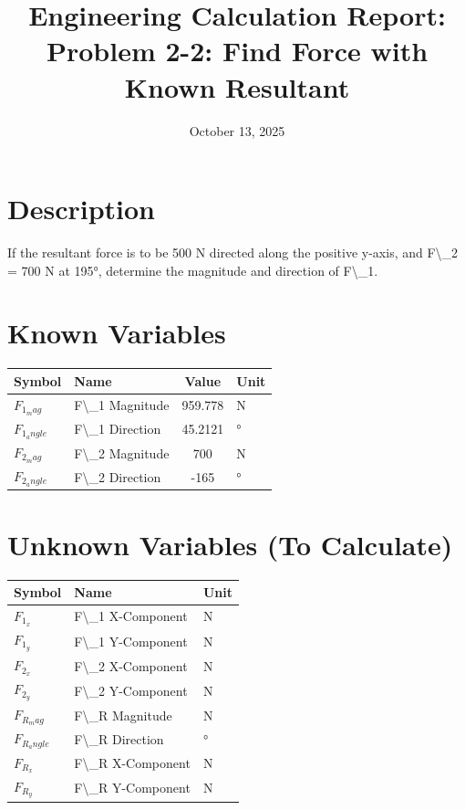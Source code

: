 \documentclass[11pt,a4paper]{article}
\title{Engineering Calculation Report: Problem 2-2: Find Force with Known Resultant}
\date{October 13, 2025}
\begin{document}
\maketitle

\section*{Description}

    If the resultant force is to be 500 N directed along the positive y-axis,
    and F\textbackslash{}_2 = 700 N at 195°, determine the magnitude and direction of F\textbackslash{}_1.
    

\section{Known Variables}

\begin{longtable}{llSl}
\toprule
Symbol & Name & {Value} & Unit \\
\midrule
\endhead
$F_{1_mag}$ & F\textbackslash{}_1 Magnitude & 959.778 & N \\
$F_{1_angle}$ & F\textbackslash{}_1 Direction & 45.2121 & ° \\
$F_{2_mag}$ & F\textbackslash{}_2 Magnitude & 700 & N \\
$F_{2_angle}$ & F\textbackslash{}_2 Direction & -165 & ° \\
\bottomrule
\end{longtable}

\section{Unknown Variables (To Calculate)}

\begin{longtable}{lll}
\toprule
Symbol & Name & Unit \\
\midrule
\endhead
$F_{1_x}$ & F\textbackslash{}_1 X-Component & N \\
$F_{1_y}$ & F\textbackslash{}_1 Y-Component & N \\
$F_{2_x}$ & F\textbackslash{}_2 X-Component & N \\
$F_{2_y}$ & F\textbackslash{}_2 Y-Component & N \\
$F_{R_mag}$ & F\textbackslash{}_R Magnitude & N \\
$F_{R_angle}$ & F\textbackslash{}_R Direction & ° \\
$F_{R_x}$ & F\textbackslash{}_R X-Component & N \\
$F_{R_y}$ & F\textbackslash{}_R Y-Component & N \\
\bottomrule
\end{longtable}
\end{document}
